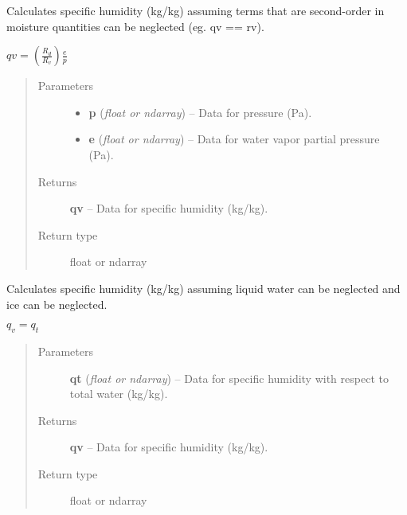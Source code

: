 \documentclass[letterpaper,10pt,english]{sphinxmanual}
\begin{document}

\begin{fulllineitems}
\label{atmos:atmos.equations.qv_from_p_e_lwv}
Calculates specific humidity (kg/kg) assuming terms that are second-order in
moisture quantities can be neglected (eg. qv == rv).

\(qv = (\frac{R_d}{R_v}) \frac{e}{p}\)
\begin{quote}\begin{description}
\item[{Parameters}] \leavevmode\begin{itemize}
\item {} 
\textbf{p} (\emph{float or ndarray}) -- Data for pressure (Pa).

\item {} 
\textbf{e} (\emph{float or ndarray}) -- Data for water vapor partial pressure (Pa).

\end{itemize}

\item[{Returns}] \leavevmode
\textbf{qv} --
Data for specific humidity (kg/kg).

\item[{Return type}] \leavevmode
float or ndarray

\end{description}\end{quote}

\end{fulllineitems}


\begin{fulllineitems}
\label{atmos:atmos.equations.qv_from_qt}
Calculates specific humidity (kg/kg) assuming liquid water can be neglected and
ice can be neglected.

\(q_v = q_t\)
\begin{quote}\begin{description}
\item[{Parameters}] \leavevmode
\textbf{qt} (\emph{float or ndarray}) -- Data for specific humidity with respect to total water (kg/kg).

\item[{Returns}] \leavevmode
\textbf{qv} --
Data for specific humidity (kg/kg).

\item[{Return type}] \leavevmode
float or ndarray

\end{description}\end{quote}

\end{fulllineitems}
\end{document}
